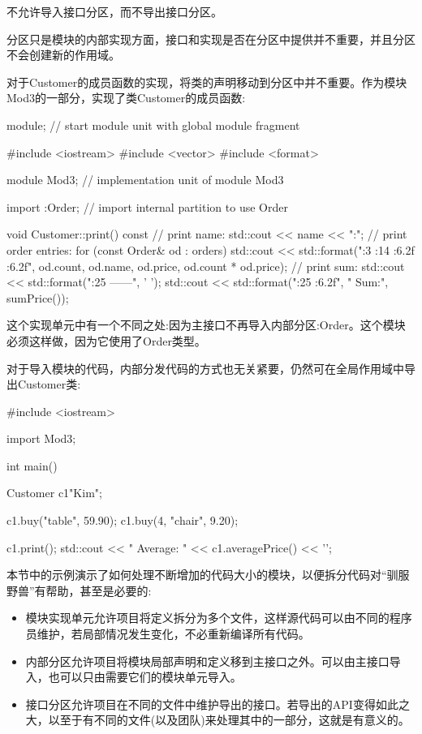 不允许导入接口分区，而不导出接口分区。

分区只是模块的内部实现方面，接口和实现是否在分区中提供并不重要，并且分区不会创建新的作用域。

对于Customer的成员函数的实现，将类的声明移动到分区中并不重要。作为模块Mod3的一部分，实现了类Customer的成员函数:


\begin{cpp}
module; // start module unit with global module fragment

#include <iostream>
#include <vector>
#include <format>

module Mod3; // implementation unit of module Mod3

import :Order; // import internal partition to use Order

void Customer::print() const
{
	// print name:
	std::cout << name << ":\n";
	// print order entries:
	for (const Order& od : orders) {
		std::cout << std::format("{:3} {:14} {:6.2f} {:6.2f}\n",
								   od.count, od.name, od.price, od.count * od.price);
	}
	// print sum:
	std::cout << std::format("{:25} ------\n", ' ');
	std::cout << std::format("{:25} {:6.2f}\n", " Sum:", sumPrice());
}
\end{cpp}

这个实现单元中有一个不同之处:因为主接口不再导入内部分区:Order。这个模块必须这样做，因为它使用了Order类型。

对于导入模块的代码，内部分发代码的方式也无关紧要，仍然可在全局作用域中导出Customer类:


\begin{cpp}
#include <iostream>

import Mod3;

int main()
{
	Customer c1{"Kim"};

	c1.buy("table", 59.90);
	c1.buy(4, "chair", 9.20);

	c1.print();
	std::cout << " Average: " << c1.averagePrice() << '\n';
}
\end{cpp}


本节中的示例演示了如何处理不断增加的代码大小的模块，以便拆分代码对“驯服野兽”有帮助，甚至是必要的:

\begin{itemize}
\item
模块实现单元允许项目将定义拆分为多个文件，这样源代码可以由不同的程序员维护，若局部情况发生变化，不必重新编译所有代码。

\item
内部分区允许项目将模块局部声明和定义移到主接口之外。可以由主接口导入，也可以只由需要它们的模块单元导入。

\item
接口分区允许项目在不同的文件中维护导出的接口。若导出的API变得如此之大，以至于有不同的文件(以及团队)来处理其中的一部分，这就是有意义的。
\end{itemize}

